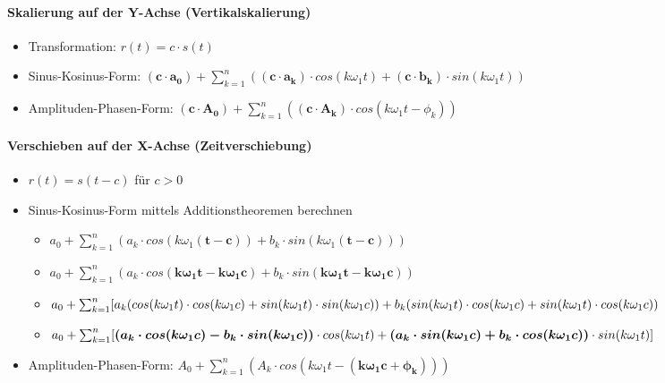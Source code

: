 \paragraph{Skalierung auf der Y-Achse (Vertikalskalierung)}
\begin{itemize}
  \item Transformation: $r(t) = c \cdot s(t)$
  \item Sinus-Kosinus-Form: $\boldsymbol{(c \cdot a_0)} + \sum_{k=1}^{n}
  ( \boldsymbol{(c \cdot a_k)} \cdot cos(k \omega_1 t) + \boldsymbol{(c
  \cdot b_k)} \cdot sin(k \omega_1 t))$
  \item Amplituden-Phasen-Form: $\boldsymbol{(c \cdot A_0)} + \sum_{k=1}^{n}
    (\boldsymbol{(c \cdot A_k)} \cdot cos(k \omega_1 t  - \phi_k))$
\end{itemize}
\paragraph{Verschieben auf der X-Achse (Zeitverschiebung)}
\begin{itemize}
  \item $r(t) = s(t-c)$ für $c > 0$
  \item Sinus-Kosinus-Form mittels Additionstheoremen berechnen
    \begin{itemize}
      \item $a_0 + \sum_{k=1}^{n} (a_k \cdot cos(k \omega_1
        \boldsymbol{(t-c)}) + b_k \cdot sin(k \omega_1 \boldsymbol{(t-c)}))$
      \item $a_0 + \sum_{k=1}^{n}(
        a_k \cdot cos(\boldsymbol{k \omega_1 t - k \omega_1 c}) +
        b_k \cdot sin(\boldsymbol{k \omega_1 t - k \omega_1 c}))$
      \item  $a_0 + \sum_{k=1}^{n}[
        a_k (cos(k \omega_1 t) \cdot cos(k \omega_1 c) + sin(k \omega_1
        t) \cdot sin(k \omega_1 c)) + \\
        b_k (sin(k \omega_1 t) \cdot cos(k \omega_1 c) + sin(k \omega_1
        t) \cdot cos(k \omega_1 c))$
      \item $a_0 + \sum_{k=1}^{n} [
        \boldsymbol{(a_k \cdot cos(k \omega_1 c) -
        b_k \cdot sin(k \omega_1 c))} \cdot cos(k \omega_1 t) + \\
        \boldsymbol{(a_k \cdot sin(k \omega_1 c) +
        b_k \cdot cos(k \omega_1 c))} \cdot sin(k \omega_1 t)]$
    \end{itemize}
  \item Amplituden-Phasen-Form: $A_0 + \sum_{k=1}^{n}
    (A_k \cdot cos(k \omega_1 t - \boldsymbol{(k \omega_1 c + \phi_k)}))$
\end{itemize}
